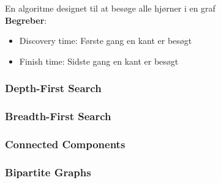 En algoritme designet til at besøge alle hjørner i en graf\\
\textbf{Begreber}:
\begin{itemize}
	\item Discovery time: Første gang en kant er besøgt
	\item Finish time: Sidste gang en kant er besøgt
\end{itemize}

\subsubsection{Depth-First Search}


\subsubsection{Breadth-First Search}

\newpage

\subsubsection{Connected Components}


\subsubsection{Bipartite Graphs}
